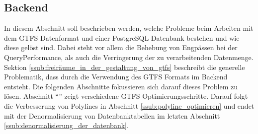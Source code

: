 \subsection{Backend}
\label{sub:backend}
  In diesem Abschnitt soll beschrieben werden, welche Probleme beim Arbeiten mit dem GTFS Datenformat und einer PostgreSQL Datenbank bestehen und wie diese gelöst sind. Dabei steht vor allem die Behebung von Engpässen bei der Query\footnotemark Performance, als auch die Verringerung der zu verarbeitenden Datenmenge. Sektion \ref{ssub:freiräume_in_der_gestaltung_von_gtfs} beschreibt die generelle Problematik, dass durch die Verwendung des GTFS Formats im Backend entsteht. Die folgenden Abschnitte fokussieren sich darauf dieses Problem zu lösen. Abschnitt "`"' zeigt verschiedene GTFS Optimierungsschritte. Darauf folgt die Verbesserung von Polylines in Abschnitt \ref{ssub:polyline_optimieren} und endet mit der Denormalisierung von Datenbanktabellen im letzten Abschnitt \ref{ssub:denormalisierung_der_datenbank}.

  

  
  
  
  
  
  
  
